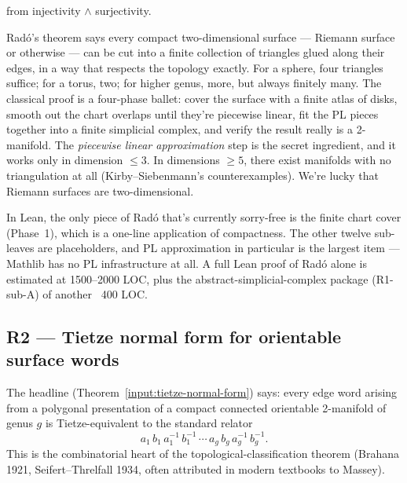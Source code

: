 \begin{lemma}
\label{lem:rado-overview-glued-bijective}
 from injectivity \(\wedge\) surjectivity.
\leanok
\end{lemma}

\begin{layman}
Rad\'o's theorem says every compact two-dimensional surface --- Riemann
surface or otherwise --- can be cut into a finite collection of
triangles glued along their edges, in a way that respects the
topology exactly.  For a sphere, four triangles suffice; for a torus,
two; for higher genus, more, but always finitely many.  The classical
proof is a four-phase ballet: cover the surface with a finite atlas
of disks, smooth out the chart overlaps until they're piecewise
linear, fit the PL pieces together into a finite simplicial complex,
and verify the result really is a 2-manifold.  The \emph{piecewise
linear approximation} step is the secret ingredient, and it works
only in dimension \(\leq 3\).  In dimensions \(\geq 5\), there exist
manifolds with no triangulation at all (Kirby--Siebenmann's
counterexamples).  We're lucky that Riemann surfaces are
two-dimensional.

In Lean, the only piece of Rad\'o that's currently sorry-free is the
finite chart cover (Phase~1), which is a one-line application of
compactness.  The other twelve sub-leaves are placeholders, and PL
approximation in particular is the largest item --- Mathlib has no PL
infrastructure at all.  A full Lean proof of Rad\'o alone is
estimated at 1500--2000 LOC, plus the abstract-simplicial-complex
package (R1-sub-A) of another ~400 LOC.
\end{layman}

\subsection{R2 --- Tietze normal form for orientable surface words}
\label{subsec:gap-R2-tietze}

The headline (Theorem~\ref{input:tietze-normal-form}) says: every edge
word arising from a polygonal presentation of a compact connected
orientable 2-manifold of genus \(g\) is Tietze-equivalent to the
standard relator
\[
  a_1\,b_1\,a_1^{-1}\,b_1^{-1}\,\cdots\,a_g\,b_g\,a_g^{-1}\,b_g^{-1}.
\]
This is the combinatorial heart of the topological-classification
theorem (Brahana 1921, Seifert--Threlfall 1934, often attributed in
modern textbooks to Massey).


